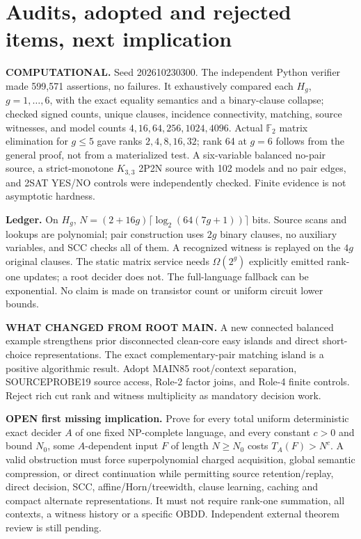 \documentclass[11pt]{article}
\begin{document}
\section{Audits, adopted and rejected items, next implication}
\noindent\textbf{COMPUTATIONAL.} Seed 202610230300. The independent Python verifier made 599,571 assertions, no failures. It exhaustively compared each $H_g$, $g=1,\ldots,6$, with the exact equality semantics and a binary-clause collapse; checked signed counts, unique clauses, incidence connectivity, matching, source witnesses, and model counts $4,16,64,256,1024,4096$. Actual $\mathbb F_2$ matrix elimination for $g\le5$ gave ranks $2,4,8,16,32$; rank 64 at $g=6$ follows from the general proof, not from a materialized test. A six-variable balanced no-pair source, a strict-monotone $K_{3,3}$ 2P2N source with 102 models and no pair edges, and 2SAT YES/NO controls were independently checked. Finite evidence is not asymptotic hardness.
\par\noindent\textbf{Ledger.} On $H_g$, $N=(2+16g)\lceil\log_2(64(7g+1))\rceil$ bits. Source scans and lookups are polynomial; pair construction uses $2g$ binary clauses, no auxiliary variables, and SCC checks all of them. A recognized witness is replayed on the $4g$ original clauses. The static matrix service needs $\Omega(2^g)$ explicitly emitted rank-one updates; a root decider does not. The full-language fallback can be exponential. No claim is made on transistor count or uniform circuit lower bounds.
\par\noindent\textbf{WHAT CHANGED FROM ROOT MAIN.} A new connected balanced example strengthens prior disconnected clean-core easy islands and direct short-choice representations. The exact complementary-pair matching island is a positive algorithmic result. Adopt MAIN85 root/context separation, SOURCEPROBE19 source access, Role-2 factor joins, and Role-4 finite controls. Reject rich cut rank and witness multiplicity as mandatory decision work.
\par\noindent\textbf{OPEN first missing implication.} Prove for every total uniform deterministic exact decider $A$ of one fixed NP-complete language, and every constant $c>0$ and bound $N_0$, some $A$-dependent input $F$ of length $N\ge N_0$ costs $T_A(F)>N^c$. A valid obstruction must force superpolynomial charged acquisition, global semantic compression, or direct continuation while permitting source retention/replay, direct decision, SCC, affine/Horn/treewidth, clause learning, caching and compact alternate representations. It must not require rank-one summation, all contexts, a witness history or a specific OBDD. Independent external theorem review is still pending.
\end{document}

